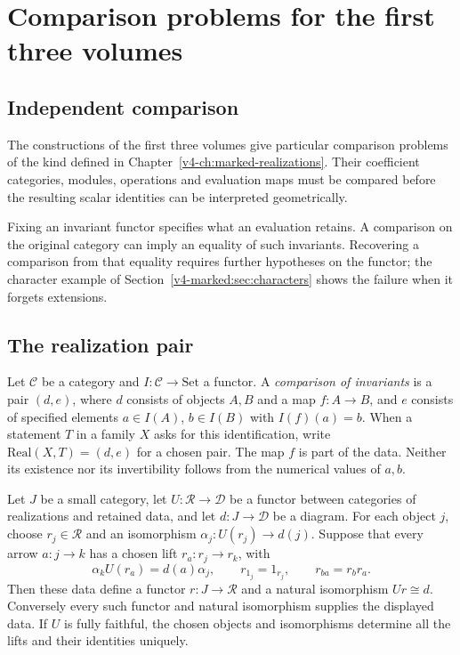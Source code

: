 \chapter{Comparison problems for the first three volumes}
\label{v4-ch:realization-formalism}

\section{Independent comparison}
\label{v4-sec:deficiency}

The constructions of the first three volumes give particular
comparison problems of the kind defined in
Chapter~\ref{v4-ch:marked-realizations}. Their coefficient categories,
modules, operations and evaluation maps must be compared before the
resulting scalar identities can be interpreted geometrically.

Fixing an invariant functor specifies what an evaluation retains.
A comparison on the original category can imply an equality of such
invariants. Recovering a comparison from that equality requires further
hypotheses on the functor; the character example of
Section~\ref{v4-marked:sec:characters} shows the failure when it
forgets extensions.

\section{The realization pair}
\label{v4-sec:realization-pair}

\begin{definition}
\label{v4-def:realization-pair}
Let \(\mathscr C\) be a category and \(I:\mathscr C\to
\mathrm{Set}\) a functor. A \emph{comparison of invariants}
is a pair \((d,e)\), where \(d\) consists of objects \(A,B\)
and a map \(f:A\to B\), and \(e\) consists of specified elements
\(a\in I(A)\), \(b\in I(B)\) with \(I(f)(a)=b\).
When a statement \(T\) in a family \(X\) asks for this
identification, write \(\mathrm{Real}(X,T)=(d,e)\) for a chosen
pair. The map \(f\) is part of the data. Neither its existence nor
its invertibility follows from the numerical values of \(a,b\).
\end{definition}

\begin{proposition}
\label{v4-thm:realization-formalism-definition}
Let \(J\) be a small category, let \(U:\mathscr R\to\mathscr D\)
be a functor between categories of realizations and retained data,
and let \(d:J\to\mathscr D\) be a diagram. For each object
\(j\), choose \(r_j\in\mathscr R\) and an isomorphism
\(\alpha_j:U(r_j)\to d(j)\). Suppose that every arrow
\(a:j\to k\) has a chosen lift \(r_a:r_j\to r_k\), with
\[
 \alpha_k U(r_a)=d(a)\alpha_j,\qquad
 r_{1_j}=1_{r_j},\qquad r_{ba}=r_b r_a.
\]
Then these data define a functor \(r:J\to\mathscr R\) and a
natural isomorphism \(Ur\cong d\). Conversely every such functor
and natural isomorphism supplies the displayed data. If \(U\) is
fully faithful, the chosen objects and isomorphisms determine all
the lifts and their identities uniquely.
\end{proposition}

